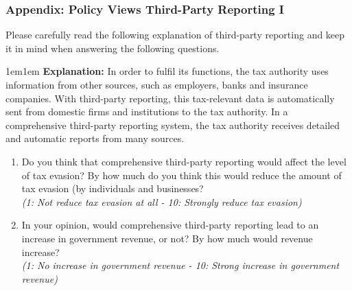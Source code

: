 \documentclass{beamer}
\begin{document}
\begin{frame}[label=Third_Party_Reporting_Appendix]
\frametitle{Appendix: Policy Views Third-Party Reporting I}
\footnotesize
\noindent Please carefully read the following explanation of third-party reporting and keep it in mind when answering the following questions. \\[0.5em]

\begin{adjustwidth}{1em}{1em}  \textbf{Explanation:} In order to fulfil its functions, the tax authority uses information from other sources, such as employers, banks and insurance companies. With third-party reporting, this tax-relevant data is automatically sent from domestic firms and institutions to the tax authority. In a comprehensive third-party reporting system, the tax authority receives detailed and automatic reports from many sources. \\[0.5em]
\end{adjustwidth}
\begin{enumerate}
    \item Do you think that comprehensive third-party reporting would affect the level of tax evasion? By how much do you think this would reduce the amount of tax evasion (by individuals and businesses?\\
    \textit{(1: Not reduce tax evasion at all - 10: Strongly reduce tax evasion)}
    \item In your opinion, would comprehensive third-party reporting lead to an increase in government revenue, or not? By how much would revenue increase?  \\
    \textit{(1: No increase in government revenue - 10: Strong increase in government revenue)}

\end{enumerate}
\end{frame}
\end{document}
